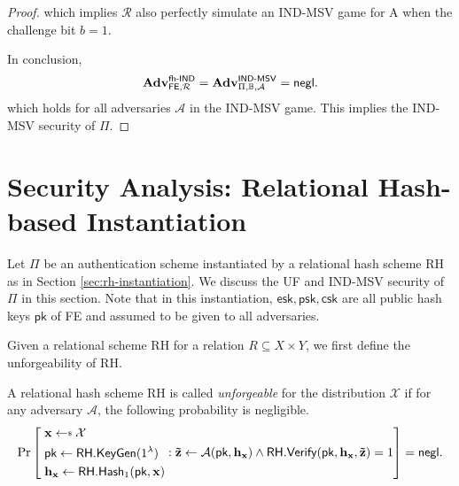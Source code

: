\begin{proof}
\noindent which implies $\mathcal{R}$ also perfectly simulate an \textsf{IND-MSV} game for A when the challenge bit $b = 1$.

In conclusion, 
\[
	\mathbf{Adv}_{\textsf{FE}, \mathcal{R}}^\textsf{fh-IND} = \mathbf{Adv}_{\Pi, \mathbb{B}, \mathcal{A}}^\textsf{IND-MSV} = \mathsf{negl}.
\]
which holds for all adversaries $\mathcal{A}$ in the \textsf{IND-MSV} game. This implies the IND-MSV security of $\Pi$.


\end{proof}




\section{Security Analysis: Relational Hash-based Instantiation}
\label{sec:security_analysis:rh}

Let $\Pi$ be an authentication scheme instantiated by a relational hash scheme \textsf{RH} as in Section \ref{sec:rh-instantiation}. We discuss the UF and IND-MSV security of $\Pi$ in this section. Note that in this instantiation, $\textsf{esk}, \textsf{psk}, \textsf{csk}$ are all public hash keys $\textsf{pk}$ of \textsf{FE} and assumed to be given to all adversaries.

Given a relational scheme \textsf{RH} for a relation $R \subseteq X \times Y$, we first define the unforgeability \cite{cryptoeprint:2014/394} of \textsf{RH}.

\begin{definition}[Unforgeability]

A relational hash scheme \textsf{RH} is called \emph{unforgeable} for the distribution $\mathcal{X}$ if for any adversary $\mathcal{A}$, the following probability is negligible.
\[
	\Pr \left [
		\begin{aligned} 
			 &\; \mathbf{x} \getsdollar \mathcal{X} \\
			 &\; \textsf{pk} \gets \textsf{RH.KeyGen}(1^\lambda) \\
			 &\; \mathbf{h_x} \gets \textsf{RH.Hash}_1(\textsf{pk}, \mathbf{x})
		\end{aligned} :
		\mathbf{\tilde{z}} \gets \mathcal{A}(\textsf{pk}, \mathbf{h_x}) \wedge \textsf{RH.Verify}(\textsf{pk}, \mathbf{h_x}, \mathbf{\tilde{z}}) = 1
		\right ] = \negl.
\]

\end{definition}


